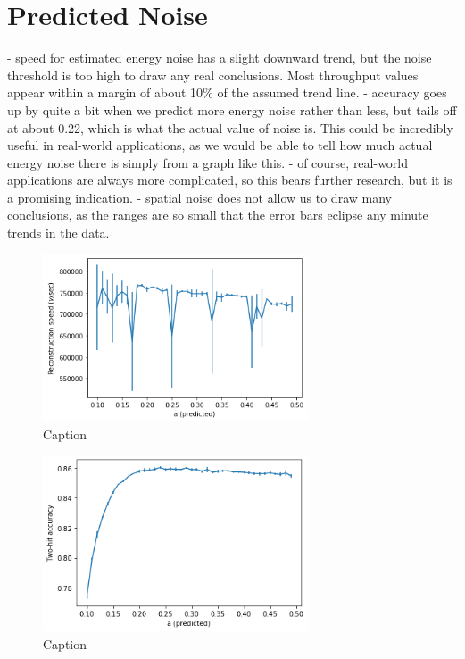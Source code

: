 \section{Predicted Noise}
- speed for estimated energy noise has a slight downward trend, but the noise threshold is too high to draw any real conclusions. Most throughput values appear within a margin of about 10\%  of the assumed trend line.
- accuracy goes up by quite a bit when we predict more energy noise rather than less, but tails off at about 0.22, which is what the actual value of noise is. This could be incredibly useful in real-world applications, as we would be able to tell how much actual energy noise there is simply from a graph like this.
- of course, real-world applications are always more complicated, so this bears further research, but it is a promising indication.
- spatial noise does not allow us to draw many conclusions, as the ranges are so small that the error bars eclipse any minute trends in the data. 

\begin{figure}
    \centering
    \includegraphics[width=0.7\textwidth]{graphs/pi_enFactor_speed.png}
    \caption{Caption}
    \label{fig:my_label}
\end{figure}

\begin{figure}
    \centering
    \includegraphics[width=0.7\textwidth]{graphs/pi_enFactor_acc.png}
    \caption{Caption}
    \label{fig:my_label}
\end{figure}


